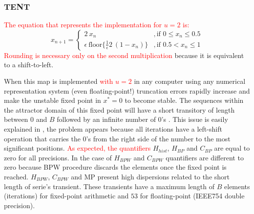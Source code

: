 \subsubsection{TENT} \label{sssec:tent}

\textcolor{red}{The equation that represents the implementation for $u=2$ is:} 
%
\begin{equation}\label{eq:tent2B2}
x_{n+1} = 
\begin{cases}
2~x_n &, \textrm{if } 0\leq x_n\leq 0.5\\
\epsilon ~\text{floor} \{\frac{1}{\epsilon} 2~(1-x_n)\} &, \textrm{if } 0.5<x_n\leq 1 
\end{cases}	
\end{equation}
%
\textcolor{red}{Rounding is necessary only on the second multiplication} because it is equivalent to a shift-to-left.

When this map is implemented \textcolor{red}{with $u=2$} in any computer using any numerical representation system (even floating-point!) truncation errors rapidly increase and make the unstable fixed point in $x^*=0$ to become stable.
The sequences within the attractor domain of this fixed point will have a short transitory of length between $0$ and $B$ followed by an infinite number of $0$'s \cite{Jessa2002,Callegari}.
This issue is easily explained in \cite{Li2004}, the problem appears because all iterations have a left-shift operation that carries the $0$'s from the right side of the number to the most significant positions.
\textcolor{red}{As expected, the quantifiers} $H_{hist}$, $H_{BP}$ and $C_{BP}$ are equal to zero for all precisions.
In the case of $H_{BPW}$ and $C_{BPW}$ quantifiers are different to zero because BPW procedure discards the elements once the fixed point is reached.
$H_{BPW}$, $C_{BPW}$ and MP present high dispersions related to the short length of serie's transient.
These transients have a maximum length of $B$ elements (iterations) for fixed-point arithmetic and $53$ for floating-point (IEEE754 double precision).

